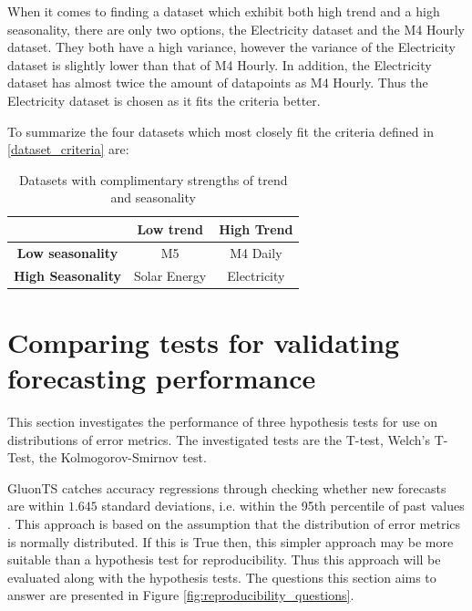 When it comes to finding a dataset which exhibit both high trend and a high seasonality, there are only two options, the Electricity dataset and the M4 Hourly dataset. They both have a high variance, however the variance of the Electricity dataset is slightly lower than that of M4 Hourly. In addition, the Electricity dataset has almost twice the amount of datapoints as M4 Hourly. Thus the Electricity dataset is chosen as it fits the criteria better.


To summarize the four datasets which most closely fit the criteria defined in \ref{dataset_criteria} are:

\begin{table}[htp]
  \centering
  \begin{tabular}{ccc}
                              & \textbf{Low trend} & \textbf{High Trend} \\
    \hline
    \textbf{Low seasonality}  & M5                 & M4 Daily            \\
    \hline
    \textbf{High Seasonality} & Solar Energy       & Electricity         \\
  \end{tabular}
  \caption{Datasets with complimentary strengths of trend and seasonality}
  \label{fig:representative_subset_of_datasets}
\end{table}

\section{Comparing tests for validating forecasting performance}
\label{sec:compairing_hypothesis_tests}
This section investigates the performance of three hypothesis tests for use on distributions of error metrics. The investigated tests are the T-test, Welch’s T-Test, the Kolmogorov-Smirnov test.

GluonTS catches accuracy regressions through checking whether new forecasts are within \(1.645\) standard deviations, i.e. within the 95th percentile of past values \cite{gluonts-github}. This approach is based on the assumption that the distribution of error metrics is normally distributed. If this is True then, this simpler approach may be more suitable than a hypothesis test for reproducibility. Thus this approach will be evaluated along with the hypothesis tests. The questions this section aims to answer are presented in Figure \ref{fig:reproducibility_questions}.

